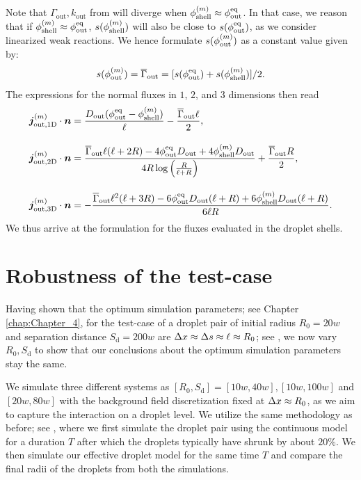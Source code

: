 \begin{appendices}
Note that $\Gamma_\mathrm{out}, k_\mathrm{out}$ from  will diverge when $\phi_\mathrm{shell}^{(m)} \approx \phi^\mathrm{eq}_\mathrm{out}$.
In that case, we reason that if $\phi_\mathrm{shell}^{(m)} \approx \phi^\mathrm{eq}_\mathrm{out}$, $s(\phi_\mathrm{shell}^{(m)})$ will also be close to $s(\phi^\mathrm{eq}_\mathrm{out})$, as we consider linearized weak reactions.
We hence formulate $s(\phi_\mathrm{out}^{(m)})$ as a constant value given by:
\begin{equation*}
    s(\phi_\mathrm{out}^{(m)}) = \overline{\Gamma}_\mathrm{out} =  [s(\phi^\mathrm{eq}_\mathrm{out}) + s(\phi_\mathrm{shell}^{(m)})] / 2.
\end{equation*}
The expressions for the normal fluxes in $1$, $2$, and $3$ dimensions then read
\begin{subequations}
\label{eqn:FluxesOut_caseB}
\begin{align}
    \boldsymbol{j}^{(m)}_\mathrm{out, 1D} \cdot \boldsymbol{n} 
    &= \frac{D_\mathrm{out} (\phi^\mathrm{eq}_\mathrm{out}-\phi_\mathrm{shell}^{(m)})}{\ell}-\frac{\overline{\Gamma}_\mathrm{out} \ell}{2},
    \\[10pt]
    \boldsymbol{j}^{(m)}_\mathrm{out, 2D} \cdot \boldsymbol{n} 
    &= \frac{\overline{\Gamma}_\mathrm{out} \ell (\ell+2 R) - 4 \phi^\mathrm{eq}_\mathrm{out} D_\mathrm{out} + 4 \phi_\mathrm{shell}^{(m)} D_\mathrm{out}}{4 R \log \left(\frac{R}{\ell+R}\right)}+\frac{\overline{\Gamma}_\mathrm{out} R}{2},
    \\[10pt]
    \boldsymbol{j}^{(m)}_\mathrm{out, 3D} \cdot \boldsymbol{n} 
    &=  -\frac{\overline{\Gamma}_\mathrm{out} \ell^2 (\ell+3 R)-6 \phi^\mathrm{eq}_\mathrm{out} D_\mathrm{out} (\ell+R)+6 \phi_\mathrm{shell}^{(m)} D_\mathrm{out} (\ell+R)}{6 \ell R}.
\end{align}
\end{subequations}
We thus arrive at the formulation for the fluxes evaluated in the droplet shells. 


\chapter{Robustness of the test-case}

\label{sec:RobustnessDropletPair}

Having shown that the optimum simulation parameters; see Chapter \ref{chap:Chapter_4}, for the test-case of a droplet pair of initial radius $R_0 = 20w$ and separation distance $S_\mathrm{d} = 200w$ are $\Delta x \approx \Delta s \approx \ell \approx R_0$; see , we now vary $R_0, S_\mathrm{d}$ to show that our conclusions about the optimum simulation parameters stay the same.

We simulate three different systems as $[R_0, S_\mathrm{d}] = [10w, 40w], [10w, 100w]$ and $[20w, 80w]$ with the background field discretization fixed at $\Delta x \approx R_0$, as we aim to capture the interaction on a droplet level.
We utilize the same methodology as before; see , where we first simulate the droplet pair using the continuous model for a duration $T$ after which the droplets typically have shrunk by about $20\%$.
We then simulate our effective droplet model for the same time $T$ and compare the final radii of the droplets from both the simulations.


\end{appendices}
